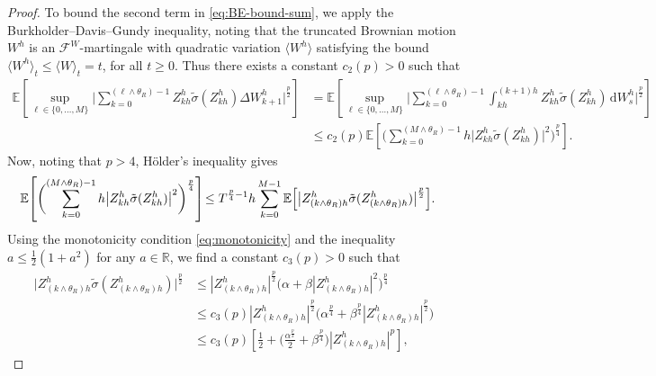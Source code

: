 \documentclass[onseside, final]{amsart}
\theoremstyle{definition}
\newcommand{\F}{\mathcal F}
\newcommand{\R}{\mathbb R}
\newcommand{\E}{\mathbb E}
\newcommand{\D}{\,\mathrm{d}}
\numberwithin{equation}{section}
\begin{document}
\begin{proof}
			To bound the second term in \eqref{eq:BE-bound-sum}, we apply the Burkholder--Davis--Gundy inequality, noting that the truncated Brownian motion $W^h$ is an $\F^W$-martingale with quadratic variation $\langle W^h \rangle$ satisfying the bound $\langle W^h \rangle_t \leq \langle W \rangle_t = t$, for all $t \geq 0$. Thus there exists a constant $c_2(p) > 0$ such that
			\begin{equation}
				\begin{split}
					\E \!\left[\sup_{\ell \in \{0, \dotsc, M\}}\bigg | \sum_{k = 0}^{(\ell \wedge \theta_R) - 1} Z^h_{kh} \tilde \sigma(Z^h_{kh}) \Delta W^h_{k + 1}\bigg |^{\frac p2}\right]\! & = \E \!\left[\sup_{\ell  \in \{0, \dotsc, M\}}\bigg | \sum_{k = 0}^{(\ell \wedge \theta_R) - 1} \int_{kh}^{(k + 1)h}Z^h_{kh} \tilde \sigma(Z^h_{kh}) \D W^h_s\bigg |^{\frac p2}\right]\!\\
					& \leq c_2(p) \E \!\left[\bigg ( \sum_{k = 0}^{(M \wedge \theta_R) - 1}h\bigl|Z^h_{kh} \tilde \sigma(Z^h_{kh})\bigr|^2 \bigg )^{\frac p4}\right]\!.
				\end{split}
			\end{equation}
			Now, noting that $p > 4$, H\"older's inequality gives
			\begin{equation}
				\begin{split}
					\E \!\left[\biggl( \sum_{k = 0}^{(M \wedge \theta_R) - 1}h\bigl|Z^h_{kh} \tilde \sigma(Z^h_{kh})\bigr|^2 \biggr)^{\frac p4}\right]\! & \leq T^{{\frac p4} - 1} h \sum_{k = 0}^{M - 1}\E\Bigl[\bigl|Z^h_{(k \wedge \theta_R)h} \tilde \sigma(Z^h_{(k \wedge \theta_R)h})\bigr|^\frac{p}{2}\Bigr].
				\end{split}
			\end{equation}
			Using the monotonicity condition \eqref{eq:monotonicity} and the inequality $a \leq \frac12(1 + a^2)$ for any $a \in \R$, we find a constant $c_3(p) > 0$ such that
			\begin{equation}
				\begin{split}
					\bigl|Z^h_{(k \wedge \theta_R)h} \tilde \sigma(Z^h_{(k \wedge \theta_R)h})\bigr|^{\frac p2} & \leq |Z^h_{(k \wedge \theta_R)h}|^{\frac p2}\bigl(\alpha + \beta |Z^h_{(k \wedge \theta_R)h}|^2\bigr)^{\frac p 4}\\
					& \leq c_3(p) |Z^h_{(k \wedge \theta_R)h}|^{\frac p2}\bigl(\alpha^{\frac p4} + \beta^{\frac p4} |Z^h_{(k \wedge \theta_R)h}|^{\frac p2}\bigr)\\
					& \leq c_3(p) \!\left[\frac 12 + \Big(\frac{\alpha^{\frac{p}{2}}}{2} + \beta^{\frac p4}\Big)|Z^h_{(k \wedge \theta_R)h}|^p\right]\!,

\end{split}
\end{equation}
\end{proof}
\end{document}
